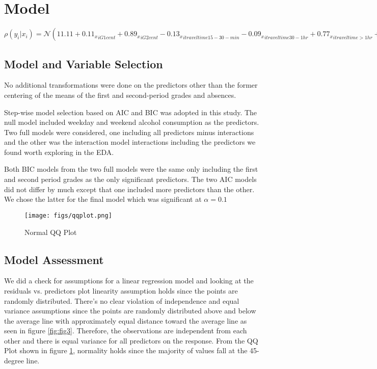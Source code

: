 \documentclass[11pt]{article}
\begin{document}
\section{Model}

$\rho(y_i | x_i) = \mathcal{N} (11.11  + {0.11_x}_{iG1cent} + {0.89_x}_{iG2cent} - {0.13_x}_{itraveltime15-30-min}  - {0.09_x}_{itraveltime30-1hr} +  {0.77_x}_{itraveltime>1hr} + {0.24_x}_{ihealthbad}  + {0.04_x}_{ihealthfair} + {0.06_x}_{ihealthgood} + {0.20_x}_{ifamrelbad} + {0.45_x}_{ifamrelfair}  + {0.33_x}_{ifamrelgood} + {0.73_x}_{ifamrelexcellent} ,\sigma^{2})$

\subsection{Model and Variable Selection}
No additional transformations were done on the predictors other than the former centering of the means of the first and second-period grades and absences.

Step-wise model selection based on AIC and BIC was adopted in this study. The null model included weekday and weekend alcohol consumption as the predictors. Two full models were considered, one including all predictors minus interactions and the other was the interaction model interactions including the predictors we found worth exploring in the EDA.

Both BIC models from the two full models were the same only including the first and second period grades as the only significant predictors.
The two AIC models did not differ by much except that one included more predictors than the other. We chose the latter for the final model which was significant at $\alpha =  0.1$


\begin{figure}
	\centering
	\texttt{[image: figs/qqplot.png]}
	\caption{Normal QQ Plot}
	\label{fig:fig2}
\end{figure}

\subsection{Model Assessment}
We did a check for assumptions for a linear regression model and looking at the residuals vs. predictors plot linearity assumption holds since the points are randomly distributed. There’s no clear violation of independence and equal variance assumptions since the points are randomly distributed above and below the average line with approximately equal distance toward the average line as seen in figure \ref{fig:fig3}. Therefore, the observations are independent from each other and there is equal variance for all predictors on the response. From the QQ Plot shown in figure \ref{fig:fig2}, normality holds since the majority of values fall at the 45-degree line.
\end{document}

